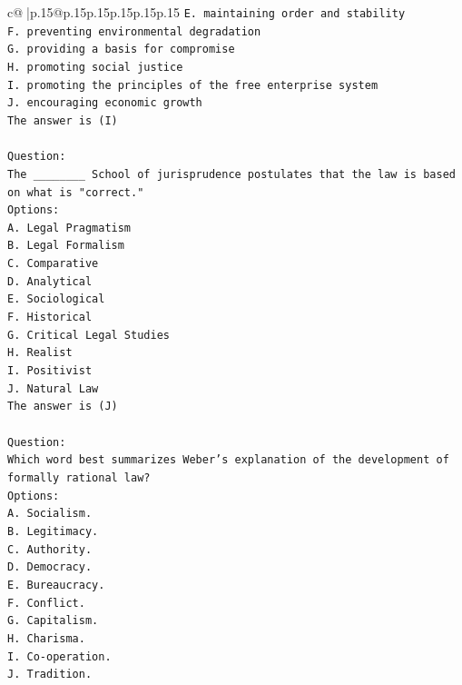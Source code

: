\documentclass{article}
\begin{document}
{\begin{supertabular}{c@{$\;$}|p{.15\linewidth}@{}p{.15\linewidth}p{.15\linewidth}p{.15\linewidth}p{.15\linewidth}p{.15\linewidth}}
{{{\texttt{E. maintaining order and stability} \\
\texttt{F. preventing environmental degradation} \\
\texttt{G. providing a basis for compromise} \\
\texttt{H. promoting social justice} \\
\texttt{I. promoting the principles of the free enterprise system} \\
\texttt{J. encouraging economic growth} \\
\texttt{The answer is (I)} \\
\\ 
\texttt{Question:} \\
\texttt{The \_\_\_\_\_\_\_\_ School of jurisprudence postulates that the law is based on what is "correct."} \\
\texttt{Options:} \\
\texttt{A. Legal Pragmatism} \\
\texttt{B. Legal Formalism} \\
\texttt{C. Comparative} \\
\texttt{D. Analytical} \\
\texttt{E. Sociological} \\
\texttt{F. Historical} \\
\texttt{G. Critical Legal Studies} \\
\texttt{H. Realist} \\
\texttt{I. Positivist} \\
\texttt{J. Natural Law} \\
\texttt{The answer is (J)} \\
\\ 
\texttt{Question:} \\
\texttt{Which word best summarizes Weber's explanation of the development of formally rational law?} \\
\texttt{Options:} \\
\texttt{A. Socialism.} \\
\texttt{B. Legitimacy.} \\
\texttt{C. Authority.} \\
\texttt{D. Democracy.} \\
\texttt{E. Bureaucracy.} \\
\texttt{F. Conflict.} \\
\texttt{G. Capitalism.} \\
\texttt{H. Charisma.} \\
\texttt{I. Co{-}operation.} \\
\texttt{J. Tradition.} \\
}}}
\end{supertabular}}
\end{document}
